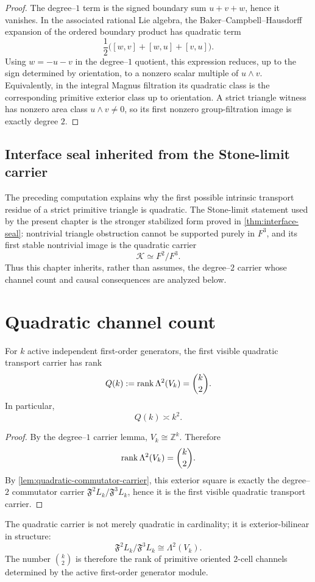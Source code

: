 \begin{proof}
The degree--\(1\) term is the signed boundary sum \(u+v+w\), hence it
vanishes.  In the associated rational Lie algebra, the
Baker--Campbell--Hausdorff expansion of the ordered boundary product has
quadratic term
\[
	\frac12\bigl([w,v]+[w,u]+[v,u]\bigr).
\]
Using \(w=-u-v\) in the degree--\(1\) quotient, this expression reduces,
up to the sign determined by orientation, to a nonzero scalar multiple of
\(u\wedge v\).  Equivalently, in the integral Magnus filtration its
quadratic class is the corresponding primitive exterior class up to
orientation.  A strict triangle witness has nonzero area class
\(u\wedge v\neq0\), so its first nonzero group-filtration image is exactly
degree \(2\).
\end{proof}
\subsection{Interface seal inherited from the Stone-limit carrier}
The preceding computation explains why the first possible intrinsic
transport residue of a strict primitive triangle is quadratic.  The
Stone-limit statement used by the present chapter is the stronger
stabilized form proved in \cref{thm:interface-seal}: nontrivial triangle
obstruction cannot be supported purely in \(F^3\), and its first stable
nontrivial image is the quadratic carrier
\[
	\mathcal K\simeq F^2/F^3.
\]
Thus this chapter inherits, rather than assumes, the degree--\(2\)
carrier whose channel count and causal consequences are analyzed below.
\section{Quadratic channel count}
\label{sec:quadratic-channel-count}
\begin{theorem}
\label{thm:binomk2}
For \(k\) active independent first-order generators, the first visible
quadratic transport carrier has rank
\[
	Q(k):=\operatorname{rank} \Lambda^2(V_k)=\binom{k}{2}.
\]
In particular,
\[
	Q(k)\asymp k^2.
\]
\end{theorem}
\begin{proof}
By the degree--\(1\) carrier lemma, \(V_k\cong\mathbb Z^k\).  Therefore
\[
	\operatorname{rank} \Lambda^2(V_k)=\binom{k}{2}.
\]
By \cref{lem:quadratic-commutator-carrier}, this exterior square is exactly
the degree--\(2\) commutator carrier
\(\mathfrak F^2L_k/\mathfrak F^3L_k\), hence it is the first visible
quadratic transport carrier.
\end{proof}
\begin{remark}
The quadratic carrier is not merely quadratic in cardinality; it is
exterior-bilinear in structure:
\[
	\mathfrak F^2L_k/\mathfrak F^3L_k\cong \Lambda^2(V_k).
\]
The number \(\binom{k}{2}\) is therefore the rank of primitive oriented
\(2\)-cell channels determined by the active first-order generator module.
\end{remark}
